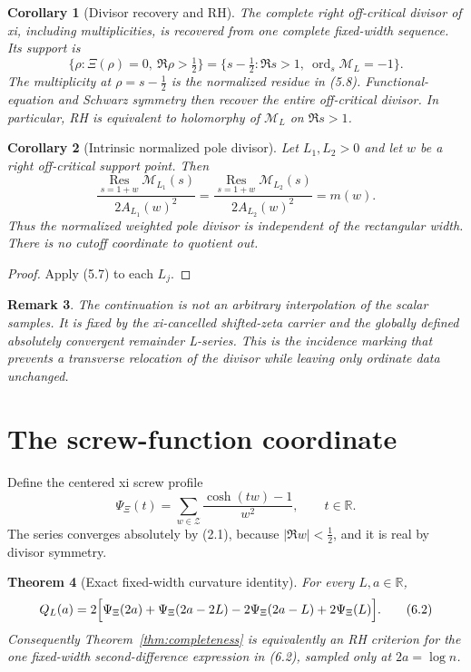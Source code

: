 \documentclass[11pt]{article}
\newtheorem{theorem}{Theorem}[section]
\newtheorem{corollary}[theorem]{Corollary}
\newtheorem{remark}[theorem]{Remark}
\newcommand{\R}{\mathbb R}
\newcommand{\XiR}{\Xi}
\newcommand{\cZ}{\mathcal Z}
\newcommand{\cM}{\mathcal M}
\newcommand{\ord}{\operatorname{ord}}
\begin{document}
\begin{corollary}[Divisor recovery and RH]\label{cor:tomography}
The complete right off-critical divisor of xi, including multiplicities, is recovered from one
complete fixed-width sequence.
Its support is
\[
  \{\rho:\XiR(\rho)=0,\ \Re\rho>\tfrac12\}
  =\{s-\tfrac12:\Re s>1,\ \ord_s\cM_L=-1\}.
  \tag{5.9}
\]
The multiplicity at $\rho=s-\tfrac12$ is the normalized residue in (5.8).  Functional-equation
and Schwarz symmetry then recover the entire off-critical divisor.  In particular, RH is
equivalent to holomorphy of $\cM_L$ on $\Re s>1$.
\end{corollary}

\begin{corollary}[Intrinsic normalized pole divisor]\label{cor:intrinsic}
Let $L_1,L_2>0$ and let $w$ be a right off-critical support point.  Then
\[
 \frac{\operatorname*{Res}_{s=1+w}\cM_{L_1}(s)}{2A_{L_1}(w)^2}
 =
 \frac{\operatorname*{Res}_{s=1+w}\cM_{L_2}(s)}{2A_{L_2}(w)^2}
 =m(w).
 \tag{5.10}
\]
Thus the normalized weighted pole divisor is independent of the rectangular width.  There is no
cutoff coordinate to quotient out.
\end{corollary}

\begin{proof}
Apply (5.7) to each $L_j$.
\end{proof}

\begin{remark}
The continuation is not an arbitrary interpolation of the scalar samples.  It is fixed by the
xi-cancelled shifted-zeta carrier and the globally defined absolutely convergent remainder
L-series.  This is the incidence marking that prevents a
transverse relocation of the divisor while leaving only ordinate data unchanged.
\end{remark}

\section{The screw-function coordinate}

Define the centered xi screw profile
\[
  \Psi_\Xi(t)=\sum_{w\in\cZ}\frac{\cosh(tw)-1}{w^2},
  \qquad t\in\R.
  \tag{6.1}
\]
The series converges absolutely by (2.1), because $|\Re w|<\frac12$, and it is real by divisor
symmetry.

\begin{theorem}[Exact fixed-width curvature identity]\label{thm:screw}
For every $L,a\in\R$,
\[
  Q_L(a)=2\Bigl[
    \Psi_\Xi(2a)+\Psi_\Xi(2a-2L)-2\Psi_\Xi(2a-L)+2\Psi_\Xi(L)
  \Bigr].
  \tag{6.2}
\]
Consequently Theorem~\ref{thm:completeness} is equivalently an RH criterion for the one
fixed-width second-difference expression in (6.2), sampled only at $2a=\log n$.
\end{theorem}
\end{document}
